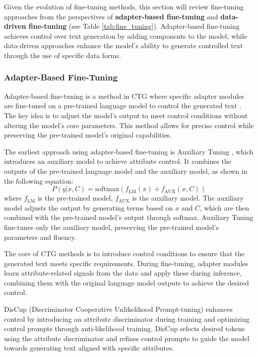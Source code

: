 \documentclass[acmsmall, screen]{acmart}
\begin{document}
Given the evolution of fine-tuning methods, this section will review fine-tuning approaches from the perspectives of \textbf{adapter-based fine-tuning} and \textbf{data-driven fine-tuning} (see Table \ref{tab:fine_tuning}). Adapter-based fine-tuning achieves control over text generation by adding components to the model, while data-driven approaches enhance the model's ability to generate controlled text through the use of specific data forms.

\subsubsection{\textbf{Adapter-Based Fine-Tuning}} 
Adapter-based fine-tuning is a method in CTG where specific adapter modules are fine-tuned on a pre-trained language model to control the generated text  \cite{houlsby_plmr19_adapter}. The key idea is to adjust the model's output to meet control conditions without altering the model's core parameters. This method allows for precise control while preserving the pre-trained model's original capabilities.

The earliest approach using adapter-based fine-tuning is Auxiliary Tuning \cite{zeldes_arxiv20_AuxiliaryTuning}, which introduces an auxiliary model to achieve attribute control. It combines the outputs of the pre-trained language model and the auxiliary model, as shown in the following equation:
\[
P(y|x, C) = \text{softmax}(f_{\text{LM}}(x) + f_{\text{AUX}}(x, C))
\]
where \(f_{\text{LM}}\) is the pre-trained model, \(f_{\text{AUX}}\) is the auxiliary model. The auxiliary model adjusts the output by generating terms based on \(x\) and \(C\), which are then combined with the pre-trained model's output through softmax. Auxiliary Tuning fine-tunes only the auxiliary model, preserving the pre-trained model's parameters and fluency.

The core of CTG methods is to introduce control conditions to ensure that the generated text meets specific requirements. During fine-tuning, adapter modules learn attribute-related signals from the data and apply these during inference, combining them with the original language model outputs to achieve the desired control.

DisCup (Discriminator Cooperative Unlikelihood Prompt-tuning) \cite{zhang_emnlp22_discup} enhances control by introducing an attribute discriminator during training and optimizing control prompts through anti-likelihood training. DisCup selects desired tokens using the attribute discriminator and refines control prompts to guide the model towards generating text aligned with specific attributes.
\end{document}
